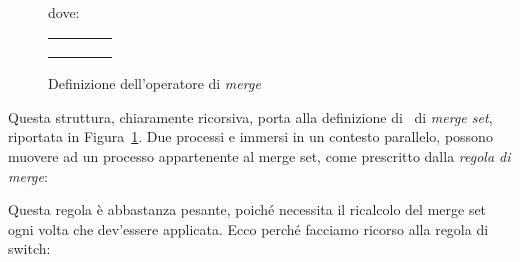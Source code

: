 \documentclass[12pt,a4paper,openright,twoside]{report}
\begin{document}
\begin{figure}[t!]
\vspace{.7em}
\begin{minipage}[t]{.7\textwidth}\end{minipage}
\begin{minipage}[t]{.93\textwidth}
 \
\vspace{.6em} \\
dove: \
\vspace{.4em} \\
\begin{tabular}{lrcl}
	&  &  &  \\
	&  &  &  \\
	&  &  & 
\end{tabular}
\end{minipage}
\vspace{.4em}
\caption{Definizione dell'operatore di \emph{merge}}
\label{fig:merge}
\end{figure}

Questa struttura, chiaramente ricorsiva, porta alla definizione di~\cite{Gug02} di \emph{merge set}, riportata in Figura~\ref{fig:merge}. Due processi  e  immersi in un contesto parallelo, possono muovere ad un processo  appartenente al merge set, come prescritto dalla \emph{regola di merge}:


Questa regola \`e abbastanza pesante, poich\'e necessita il ricalcolo del merge set ogni volta che dev'essere applicata. Ecco perch\'e facciamo ricorso alla regola di switch:
\end{document}
